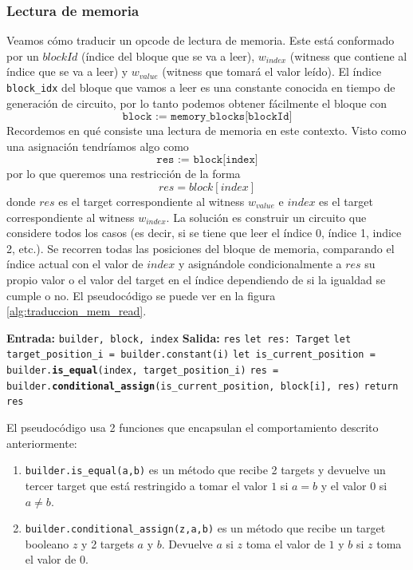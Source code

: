 \subsubsection{\textbf{Lectura de memoria}}
Veamos cómo traducir un opcode de lectura de memoria. Este está conformado por un $blockId$ (índice del bloque que se va a leer), $w_{index}$ (witness que contiene al índice que se va a leer) y $w_{value}$ (witness que tomará el valor leído). 
El índice \texttt{block\_idx} del bloque que vamos a leer es una constante conocida en tiempo de generación de circuito, por lo tanto podemos obtener fácilmente el bloque con
\[
\texttt{block := memory\_blocks[blockId]}
\]
Recordemos en qué consiste una lectura de memoria en este contexto. Visto como una asignación tendríamos algo como
\[
\texttt{res := block[index]}
\]
por lo que queremos una restricción de la forma
$$res = block[index]$$
donde $res$ es el target correspondiente al witness $w_{value}$ e $index$ es el target correspondiente al witness $w_{index}$. La solución es construir un circuito que considere todos los casos (es decir, si se tiene que leer el índice 0, índice 1, indice 2, etc.). Se recorren todas las posiciones del bloque de memoria, comparando el índice actual con el valor de $index$ y asignándole condicionalmente a $res$ su propio valor o el valor del target en el índice dependiendo de si la igualdad se cumple o no. El pseudocódigo se puede ver en la figura \ref{alg:traduccion_mem_read}.

\begin{algorithm}
\begin{algorithmic}[1]
\State \textbf{Entrada:} \texttt{builder, block, index}
\State \textbf{Salida:} \texttt{res}
\State \texttt{let res: Target}
    \State \texttt{let target\_position\_i = builder.constant(i)}
    \State \texttt{let is\_current\_position = builder.\textbf{is\_equal}(index, target\_position\_i)}
    \State \texttt{res = builder.\textbf{conditional\_assign}(is\_current\_position, block[i], res)}
\EndFor
\State \texttt{return res}
\end{algorithmic}
\caption{Traducción del opcode \texttt{MemRead}}
\label{alg:traduccion_mem_read}
\end{algorithm}

El pseudocódigo usa 2 funciones que encapsulan el comportamiento descrito anteriormente: 
\begin{enumerate}
    \item \texttt{builder.is\_equal(a,b)} es un método que recibe 2 targets y devuelve un tercer target que está restringido a tomar el valor $1$ si $a=b$ y el valor $0$ si $a \neq b$.

    \item \texttt{builder.conditional\_assign(z,a,b)} es un método que recibe un target booleano $z$ y 2 targets $a$ y $b$. Devuelve $a$ si $z$ toma el valor de $1$ y $b$ si $z$ toma el valor de $0$.
\end{enumerate}

